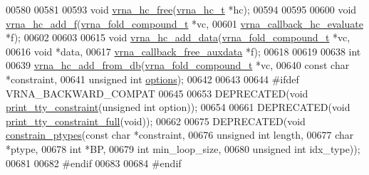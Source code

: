 \begin{DoxyCode}
00580 
00581 
00593 \textcolor{keywordtype}{void} \hyperlink{group__hard__constraints_ga696dcf77887d856c6f21ea266d8b9ca2}{vrna\_hc\_free}(\hyperlink{group__hard__constraints_structvrna__hc__s}{vrna\_hc\_t} *hc);
00594 
00595 
00600 \textcolor{keywordtype}{void} \hyperlink{constraints__hard_8h_af220427ba7ecc8e786a07b7799658f18}{vrna\_hc\_add\_f}(\hyperlink{group__fold__compound_structvrna__fc__s}{vrna\_fold\_compound\_t}       *vc,
00601                    \hyperlink{group__hard__constraints_gae465f1d4a3d8b6592b38ecbb0d9f613d}{vrna\_callback\_hc\_evaluate}  *f);
00602 
00603 
00615 \textcolor{keywordtype}{void} \hyperlink{constraints__hard_8h_a128920e0af52e4196a9d59fa13336c7c}{vrna\_hc\_add\_data}(\hyperlink{group__fold__compound_structvrna__fc__s}{vrna\_fold\_compound\_t}        *vc,
00616                       \textcolor{keywordtype}{void}                        *data,
00617                       \hyperlink{group__fold__compound_ga7806651f51b195013839a218b3bbd5a3}{vrna\_callback\_free\_auxdata}  *f);
00618 
00619 
00638 \textcolor{keywordtype}{int}
00639 \hyperlink{group__hard__constraints_ga5b4de3247b67358080c176b94591a8e6}{vrna\_hc\_add\_from\_db}(\hyperlink{group__fold__compound_structvrna__fc__s}{vrna\_fold\_compound\_t}  *vc,
00640                     \textcolor{keyword}{const} \textcolor{keywordtype}{char}            *constraint,
00641                     \textcolor{keywordtype}{unsigned} \textcolor{keywordtype}{int}          \hyperlink{group__hard__constraints_a468414760f373f7dc0eb1fd47cf708d0}{options});
00642 
00643 
00644 \textcolor{preprocessor}{#ifdef  VRNA\_BACKWARD\_COMPAT}
00645 
00653 DEPRECATED(\textcolor{keywordtype}{void} \hyperlink{constraints__hard_8h_a4d167deb70bb51723e44374dc981deb2}{print\_tty\_constraint}(\textcolor{keywordtype}{unsigned} \textcolor{keywordtype}{int} option));
00654 
00661 DEPRECATED(\textcolor{keywordtype}{void} \hyperlink{constraints__hard_8h_ae8ae8a34962b9959be3f6c40f0a80ac1}{print\_tty\_constraint\_full}(\textcolor{keywordtype}{void}));
00662 
00675 DEPRECATED(\textcolor{keywordtype}{void} \hyperlink{constraints__hard_8h_a36c3a6c3218b041f992052767bc74549}{constrain\_ptypes}(\textcolor{keyword}{const} \textcolor{keywordtype}{char}   *constraint,
00676                                  \textcolor{keywordtype}{unsigned} \textcolor{keywordtype}{int} length,
00677                                  \textcolor{keywordtype}{char}         *ptype,
00678                                  \textcolor{keywordtype}{int}          *BP,
00679                                  \textcolor{keywordtype}{int}          min\_loop\_size,
00680                                  \textcolor{keywordtype}{unsigned} \textcolor{keywordtype}{int} idx\_type));
00681 
00682 \textcolor{preprocessor}{#endif}
00683 
00684 \textcolor{preprocessor}{#endif}
\end{DoxyCode}
